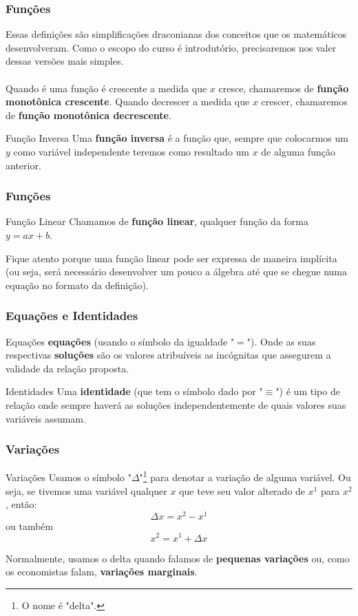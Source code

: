 \documentclass{beamer}[10]
\begin{document}
\begin{frame}
	\frametitle{Funções}

	Essas definições são simplificações draconianas dos conceitos que os matemáticos desenvolveram. Como o escopo do curso é introdutório, precisaremos nos valer dessas versões mais simples.
	\\~\\
	Quando é uma função é crescente a medida que $x$ cresce, chamaremos de \textbf{função monotônica crescente}. Quando decrescer a medida que $x$ crescer, chamaremos de \textbf{função monotônica decrescente}.

	\begin{block}{Função Inversa}
		Uma \textbf{função inversa} é a função que, sempre que colocarmos um $y$ como variável independente teremos como resultado um $x$ de alguma função anterior.
	\end{block}
\end{frame}

\begin{frame}
	\frametitle{Funções}

	\begin{block}{Função Linear}
		Chamamos de \textbf{função linear}, qualquer função da forma $y = ax + b$.
	\end{block}
	Fique atento porque uma função linear pode ser expressa de maneira implícita (ou seja, será necessário desenvolver um pouco a álgebra até que se chegue numa equação no formato da definição).
\end{frame}

\begin{frame}
	\frametitle{Equações e Identidades}
		
	\begin{block}{Equações}
		\textbf{equações} (usando o símbolo da igualdade "$=$"). Onde as suas respectivas \textbf{soluções} são os valores atribuíveis as incógnitas que assegurem a validade da relação proposta.
	\end{block}

	\begin{block}{Identidades}
		Uma \textbf{identidade} (que tem o símbolo dado por "$\equiv$") é um tipo de relação onde sempre haverá as soluções independentemente de quais valores suas variáveis assumam.
	\end{block}
\end{frame}

\begin{frame}
	\frametitle{Variações}

	\begin{block}{Variações}
		Usamos o símbolo "$\Delta$"\footnote{O nome é "delta".} para denotar a variação de alguma variável. Ou seja, se tivemos uma variável qualquer $x$ que teve seu valor alterado de $x^1$ para $x^2$, então:
		$$ \Delta x = x^2 - x^1 $$
		ou também
		$$ x^2 = x^1 + \Delta x $$
	\end{block}

	Normalmente, usamos o delta quando falamos de \textbf{pequenas variações} ou, como os economistas falam, \textbf{variações marginais}.
\end{frame}
\end{document}
